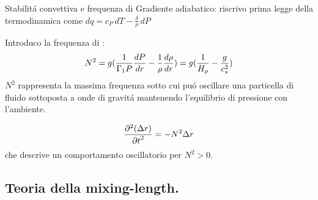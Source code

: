 \begin{wordonframe}{Stabilit\'a convettiva e frequenza di \bv{}}
Gradiente adiabatico: riscrivo prima legge della termodinamica come $dq=c_P\,dT-\frac{\delta}{\rho}\,dP$

Introduco la frequenza di \bv{}:
\begin{equation*}
N^2=g(\frac{1}{\Gamma_1P}\TDy{r}{P}-\frac{1}{\rho}\TDy{r}{\rho})=g(\frac{1}{\densityscale{}}-\frac{g}{c_s^2})\label{eq:bvfs}
\end{equation*}
$N^2$ rappresenta la massima frequenza sotto cui pu\'o oscillare una particella di fluido sottoposta a onde di gravit\'a mantenendo l'equilibrio di pressione con l'ambiente.

\begin{equation*}
\PtwoDy{t}{(\Delta r)}=-N^2\Delta r
\end{equation*}
che descrive un comportamento oscillatorio per $N^2>0$.

\end{wordonframe}

\subsection{Teoria della mixing-length.}

